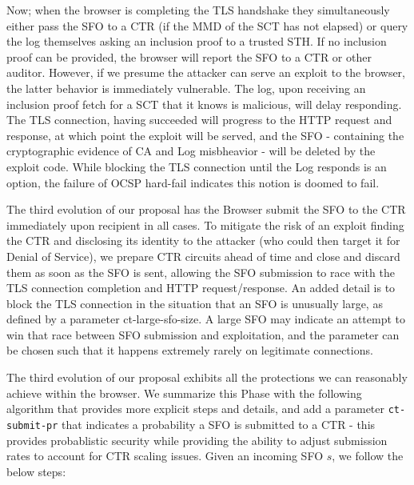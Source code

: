 Now; when the browser is completing the TLS handshake they simultaneously either pass the SFO to a CTR (if the MMD of the SCT has not elapsed) or query the log themselves asking an inclusion proof to a trusted STH. If no inclusion proof can be provided, the browser will report the SFO to a CTR or other auditor. However, if we presume the attacker can serve an exploit to the browser, the latter behavior is immediately vulnerable. The log, upon receiving an inclusion proof fetch for a SCT that it knows is malicious, will delay responding. The TLS connection, having succeeded will progress to the HTTP request and response, at which point the exploit will be served, and the SFO - containing the cryptographic evidence of CA and Log misbheavior - will be deleted by the exploit code. While blocking the TLS connection until the Log responds is an option, the failure of OCSP hard-fail indicates this notion is doomed to fail. %

The third evolution of our proposal has the Browser submit the SFO to the CTR immediately upon recipient in all cases. To mitigate the risk of an exploit finding the CTR and disclosing its identity to the attacker (who could then target it for Denial of Service), we prepare CTR circuits ahead of time and close and discard them as soon as the SFO is sent, allowing the SFO submission to race with the TLS connection completion and HTTP request/response.  An added detail is to block the TLS connection in the situation that an SFO is unusually large, as defined by a parameter ct-large-sfo-size. A large SFO may indicate an attempt to win that race between SFO submission and exploitation, and the parameter can be chosen such that it happens extremely rarely on legitimate connections.

The third evolution of our proposal exhibits all the protections we can reasonably achieve within the browser. We summarize this Phase with the following algorithm that provides more explicit steps and details, and add a parameter \texttt{ct-submit-pr} that indicates a probability a SFO is submitted to a CTR - this provides probablistic security while providing the ability to adjust submission rates to account for CTR scaling issues. Given an incoming SFO $s$, we follow the below steps: %


